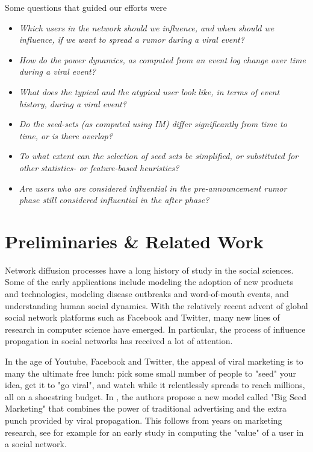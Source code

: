 \documentclass[sigconf]{acmart}
\begin{document}
Some questions that guided our efforts were
\begin{itemize}
\item \emph{Which users in the network should we influence, and when should we influence, if we want to spread a rumor during a viral event?}

\item \emph{How do the power dynamics, as computed from an event log change over time during a viral event?}

\item \emph{What does the typical and the atypical user look like, in terms of event history, during a viral event?}

\item \emph{Do the seed-sets (as computed using IM) differ significantly from time to time, or is there overlap?}

\item \emph{To what extent can the selection of seed sets be simplified, or substituted for other statistics- or feature-based heuristics? }

\item \emph{Are users who are considered influential in the pre-announcement rumor phase still considered influential in the after phase?}

\end{itemize}

\section{Preliminaries \& Related Work}

Network diffusion processes have a long history of study in the social sciences. Some of the early applications include modeling the adoption of new products and technologies, modeling disease outbreaks and word-of-mouth events, and understanding human social dynamics. With the relatively recent advent of global social network platforms such as Facebook and Twitter, many new lines of research in computer science have emerged. In particular, the process of influence propagation in social networks has received a lot of attention.

In the age of Youtube, Facebook and Twitter, the appeal of viral marketing is to many the ultimate free lunch: pick some small number of people to "seed" your idea, get it to "go viral", and watch while it relentlessly spreads to reach millions, all on a shoestring budget. In \cite{watts2007viral}, the authors propose a new model called "Big Seed Marketing" that combines the power of traditional advertising and the extra punch provided by viral propagation. This follows from years on marketing research, see for example \cite{domingos2001mining} for an early study in computing the "value" of a user in a social network. 
\end{document}
